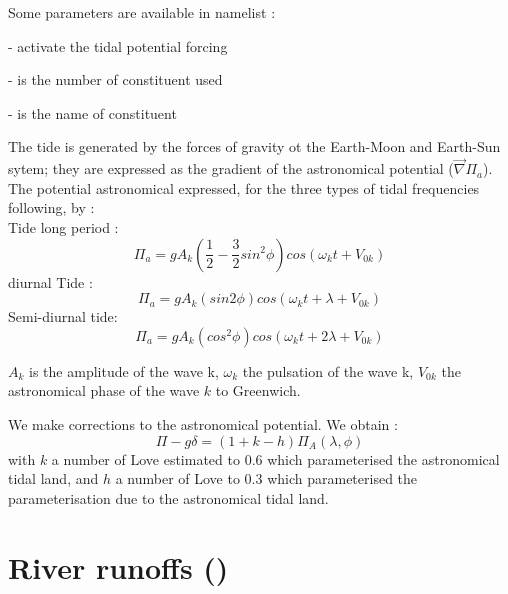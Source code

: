 \documentclass[NEMO_book]{subfiles}
\begin{document}
Some parameters are available in namelist :

-  activate the tidal potential forcing

-  is the number of constituent used

-  is the name of constituent

The tide is generated by the forces of gravity ot the Earth-Moon and Earth-Sun sytem;
they are expressed as the gradient of the astronomical potential ($\vec{\nabla}\Pi_{a}$). \\

The potential astronomical expressed, for the three types of tidal frequencies
following, by : \\
Tide long period :
\begin{equation}
\Pi_{a}=gA_{k}(\frac{1}{2}-\frac{3}{2}sin^{2}\phi)cos(\omega_{k}t+V_{0k})
\end{equation}
diurnal Tide :
\begin{equation}
\Pi_{a}=gA_{k}(sin 2\phi)cos(\omega_{k}t+\lambda+V_{0k})
\end{equation}
Semi-diurnal tide:
\begin{equation}
\Pi_{a}=gA_{k}(cos^{2}\phi)cos(\omega_{k}t+2\lambda+V_{0k})
\end{equation}


$A_{k}$ is the amplitude of the wave k, $\omega_{k}$ the pulsation of the wave k, $V_{0k}$ the astronomical phase of the wave
$k$ to Greenwich.

We make corrections to the astronomical potential.
We obtain : 
\begin{equation}
\Pi-g\delta = (1+k-h) \Pi_{A}(\lambda,\phi)
\end{equation}
with $k$ a number of Love estimated to 0.6 which parameterised the astronomical tidal land,
and $h$ a number of Love to 0.3 which parameterised the parameterisation due to the astronomical tidal land.

\section   [River runoffs (\textit{sbcrnf})]
			{River runoffs ()}
\label{SBC_rnf}
\end{document}
